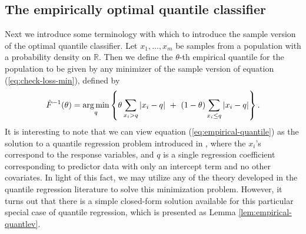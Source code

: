 \subsection{The empirically optimal quantile classifier}
\label{sec:empirical-classifier}

Next we introduce some terminology with which to introduce the sample version of
the optimal quantile classifier.  Let $x_1, \dots, x_m$ be samples from a
population with a probability density on $\mathbb{R}$.  Then we define the
$\theta$-th empirical quantile for the population to be given by any minimizer
of the sample version of equation (\ref{eq:check-loss-min}), defined by
\begin{equation}
  \label{eq:empirical-quantile}
  \hat{F}^{-1} (\theta) = \operatorname*{arg\,min}_q \left\{
    \theta \sum_{ x_{i} > q } |x_{i} - q| ~+~
    (1 - \theta) \sum_{ x_{i} \leq q } |x_{i} - q|
  \right\}.
\end{equation}
It is interesting to note that we can view equation
(\ref{eq:empirical-quantile}) as the solution to a quantile regression problem
introduced in \cite{koenker1978}, where the $x_i$'s correspond to the response
variables, and $q$ is a single regression coefficient corresponding to predictor
data with only an intercept term and no other covariates.  In light of this
fact, we may utilize any of the theory developed in the quantile regression
literature to solve this minimization problem.  However, it turns out that there
is a simple closed-form solution available for this particular special case of
quantile regression, which is presented as Lemma \ref{lem:empirical-quantlev}.

